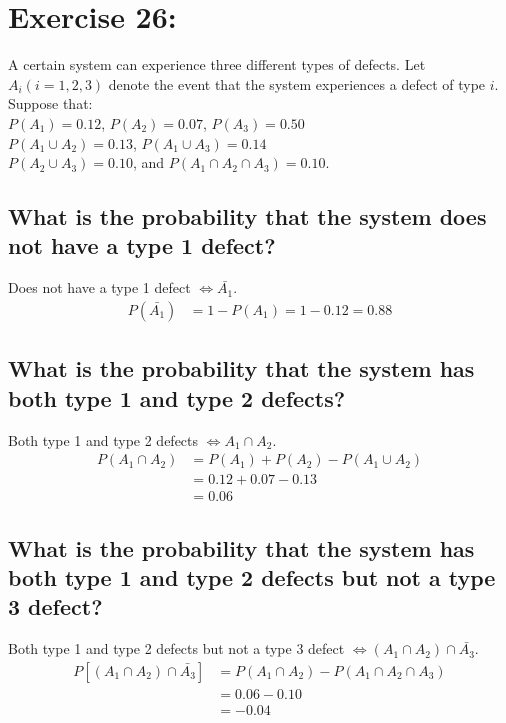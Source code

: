 \newpage
\section{Exercise 26:}

\begin{displayquote}
    A certain system can experience three different types of defects. Let \(A_i(i = 1, 2, 3)\) denote the event that the system experiences a defect of type \(i\). Suppose that: \\

    \(P(A_1) = 0.12\), \(P(A_2) = 0.07\), \(P(A_3) = 0.50\) \\
    \(P(A_1 \cup A_2) = 0.13\), \(P(A_1 \cup A_3) = 0.14\) \\
    \(P(A_2 \cup A_3) = 0.10\), and \(P(A_1 \cap A_2 \cap A_3) = 0.10\).
\end{displayquote}


\subsection{What is the probability that the system does not have a type 1 defect?}
Does not have a type 1 defect \(\Leftrightarrow  \bar{A_1}\).
\begin{equation}
    \begin{split}
        P(\bar{A_1}) & = 1 - P(A_1) = 1 - 0.12 = 0.88
    \end{split}
\end{equation}

\subsection{What is the probability that the system has both type
    1 and type 2 defects?}
Both type 1 and type 2 defects \(\Leftrightarrow  A_1 \cap A_2\).
\begin{equation}
    \begin{split}
        P(A_1 \cap A_2) & = P(A_1) + P(A_2) - P(A_1 \cup A_2) \\
                        & = 0.12 + 0.07 - 0.13                \\
                        & = 0.06
    \end{split}
\end{equation}

\subsection{What is the probability that the system has both type 1 and type 2 defects but not a type 3 defect?}
Both type 1 and type 2 defects but not a type 3 defect \(\Leftrightarrow  (A_1 \cap A_2) \cap \bar{A_3}\).
\begin{equation}
    \begin{split}
        P[(A_1 \cap A_2) \cap \bar{A_3}] & = P(A_1 \cap A_2) - P(A_1 \cap A_2 \cap A_3) \\
                                         & = 0.06 - 0.10                                \\
                                         & = -0.04
    \end{split}
\end{equation}


